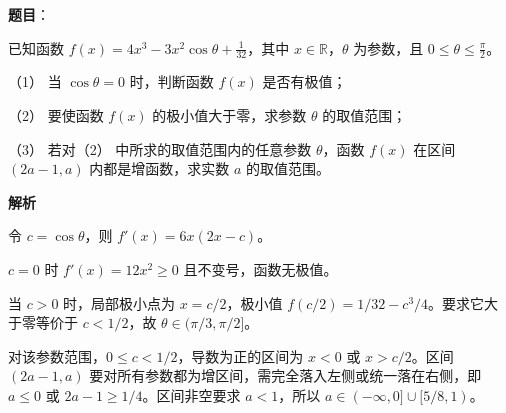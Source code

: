 \begin{answer}

\textbf{题目}：

已知函数 $f(x)=4x^3-3x^2\cos\theta+\frac1{32}$，其中 $x\in\mathbb R$，$\theta$ 为参数，且 $0\le\theta\le\frac\pi2$。

（1） 当 $\cos\theta=0$ 时，判断函数 $f(x)$ 是否有极值；

（2） 要使函数 $f(x)$ 的极小值大于零，求参数 $\theta$ 的取值范围；

（3） 若对（2） 中所求的取值范围内的任意参数 $\theta$，函数 $f(x)$ 在区间 $(2a-1,a)$ 内都是增函数，求实数 $a$ 的取值范围。

\textbf{解析}

令 $c=\cos\theta$，则 $f'(x)=6x(2x-c)$。


$c=0$ 时 $f'(x)=12x^2\ge0$ 且不变号，函数无极值。


当 $c>0$ 时，局部极小点为 $x=c/2$，极小值 $f(c/2)=1/32-c^3/4$。要求它大于零等价于 $c<1/2$，故 $\theta\in(\pi/3,\pi/2]$。


对该参数范围，$0\le c<1/2$，导数为正的区间为 $x<0$ 或 $x>c/2$。区间 $(2a-1,a)$ 要对所有参数都为增区间，需完全落入左侧或统一落在右侧，即 $a\le0$ 或 $2a-1\ge1/4$。区间非空要求 $a<1$，所以 $a\in(-\infty,0]\cup[5/8,1)$。


\gkanswer{答案（2）：$\theta\in(\pi/3,\pi/2]$。}

\gkanswer{答案（3）：$a\in(-\infty,0]\cup[5/8,1)$。}

\end{answer}
